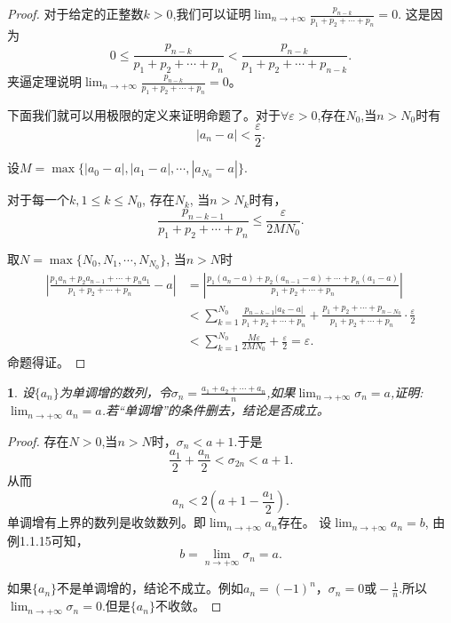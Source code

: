 \documentclass[utf8]{book}
\newtheorem{example}{}[section]             %
\begin{document}
\begin{proof}
对于给定的正整数$k>0$,我们可以证明$\displaystyle\lim_{n\to +\infty}\frac{p_{n-k}}{p_1+p_2+\cdots+p_n}=0$.
这是因为
$$0\leq \frac{p_{n-k}}{p_1+p_2+\cdots+p_n} < \frac{p_{n-k}}{p_1+p_2+\cdots+p_{n-k}}.$$
夹逼定理说明$\displaystyle\lim_{n\to +\infty}\frac{p_{n-k}}{p_1+p_2+\cdots+p_n}=0$。

下面我们就可以用极限的定义来证明命题了。对于$\forall \varepsilon > 0$,存在$N_0$,当$n>N_0$时有$$\left|a_n-a\right| < \frac{\varepsilon}{2}.$$

设$M = \max\{\left|a_0 -a\right|, \left|a_1 -a\right|, \cdots, \left|a_{N_0} -a\right|\}$.

对于每一个$k, 1\leq k \leq N_0$, 存在$N_k$, 当$n>N_k$时有，
$$\frac{p_{n-k-1}}{p_1+p_2+\cdots+p_n} \leq \frac{\varepsilon}{2MN_0}.$$

取$N=\max\{N_0, N_1, \cdots, N_{N_0}\}$, 当$n>N$时
\begin{equation*}
\begin{split}
\left|\frac{p_1a_n+p_2a_{n-1}+\cdots+p_na_1}{p_1+p_2+\cdots+p_n} - a\right| &= \left|\frac{p_1(a_n-a)+p_2(a_{n-1}-a)+\cdots+p_n(a_1-a)}{p_1+p_2+\cdots+p_n}\right|\\
&<\sum_{k=1}^{N_0} \frac{p_{n-k-1}|a_k - a|}{p_1+p_2+\cdots+p_n} + \frac{p_1 + p_2 + \cdots + p_{n-N_0}}{p_1+p_2+\cdots+p_n}\cdot\frac{\varepsilon}{2} \\
&<\sum_{k=1}^{N_0}\frac{M\varepsilon}{2MN_0} + \frac{\varepsilon}{2} = \varepsilon.
\end{split}
\end{equation*}
命题得证。
\end{proof}
\begin{example}
设$\{a_n\}$为单调增的数列，令$\sigma_n=\displaystyle\frac{a_1+a_2+\cdots+a_n}{n}$,如果$\displaystyle\lim_{n\to +\infty}\sigma_n = a$,证明:$\displaystyle\lim_{n\to +\infty}a_n = a$.若“单调增”的条件删去，结论是否成立。
\end{example}
\begin{proof}
存在$N > 0$,当$n>N$时，$\sigma_n < a+1$.于是
$$\frac{a_1}{2}+\frac{a_n}{2} < \sigma_{2n} < a + 1.$$从而$$a_n < 2\left(a+1-\frac{a_1}{2}\right).$$
单调增有上界的数列是收敛数列。即$\displaystyle\lim_{n\to +\infty}a_n$存在。
设$\displaystyle\lim_{n\to +\infty}a_n=b$, 由例1.1.15可知，
$$b=\displaystyle\lim_{n\to +\infty}\sigma_n = a.$$

如果$\{a_n\}$不是单调增的，结论不成立。例如$a_n=(-1)^n$，$\sigma_n = 0 \text{或} -\frac{1}{n}$.所以$\displaystyle\lim_{n\to +\infty}\sigma_n = 0$.但是$\{a_n\}$不收敛。
\end{proof}
\end{document}
